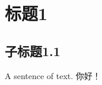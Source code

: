 \documentclass[a4paper,12pt]{article}
\begin{document}
\section{标题1}
\subsection{子标题1.1}

A sentence of text. 你好！
\end{document}
